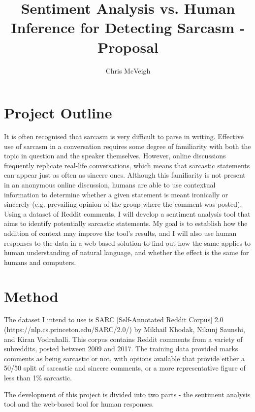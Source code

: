 \documentclass[a4paper,12pt]{article}
\begin{document}
\title{Sentiment Analysis vs. Human Inference for Detecting Sarcasm - Proposal}
\author{Chris McVeigh}
\date{}
\maketitle

\section{Project Outline}
It is often recognised that sarcasm is very difficult to parse in writing. Effective use of sarcasm in a conversation requires some degree of familiarity with both the topic in question and the speaker themselves. However, online discussions frequently replicate real-life conversations, which means that sarcastic statements can appear just as often as sincere ones. Although this familiarity is not present in an anonymous online discussion, humans are able to use contextual information to determine whether a given statement is meant ironically or sincerely (e.g. prevailing opinion of the group where the comment was posted). Using a dataset of Reddit comments, I will develop a sentiment analysis tool that aims to identify potentially sarcastic statements. My goal is to establish how the addition of context may improve the tool's results, and I will also use human responses to the data in a web-based solution to find out how the same applies to human understanding of natural language, and whether the effect is the same for humans and computers.

\section{Method}
The dataset I intend to use is SARC [Self-Annotated Reddit Corpus] 2.0 (https://nlp.cs.princeton.edu/SARC/2.0/) by Mikhail Khodak, Nikunj Saunshi, and Kiran Vodrahalli. This corpus contains Reddit comments from a variety of subreddits, posted between 2009 and 2017. The training data provided marks comments as being sarcastic or not, with options available that provide either a 50/50 split of sarcastic and sincere comments, or a more representative figure of less than 1\% sarcastic.

The development of this project is divided into two parts - the sentiment analysis tool and the web-based tool for human responses.
\end{document}
